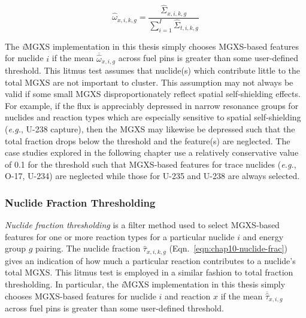 \begin{equation}
\label{eqn:chap10-tot-frac}
\hat{\omega}_{x,i,k,g} = \frac{\hat{\Sigma}_{x,i,k,g}}{\displaystyle\sum\limits_{i=1}^{I}\hat{\Sigma}_{t,i,k,g}}
\end{equation}

The \textit{i}\ac{MGXS} implementation in this thesis simply chooses \ac{MGXS}-based features for nuclide $i$ if the mean $\overline{\hat{\omega}}_{x,i,g}$ across fuel pins is greater than some user-defined threshold. This litmus test assumes that nuclide(s) which contribute little to the total \ac{MGXS} are not important to cluster. This assumption may not always be valid if some small \ac{MGXS} disproportionately reflect spatial self-shielding effects. For example, if the flux is appreciably depressed in narrow resonance groups for nuclides and reaction types which are especially sensitive to spatial self-shielding (\textit{e.g.}, U-238 capture), then the \ac{MGXS} may likewise be depressed such that the total fraction drops below the threshold and the feature(s) are neglected. The case studies explored in the following chapter use a relatively conservative value of 0.1 for the threshold such that \ac{MGXS}-based features for trace nuclides (\textit{e.g.}, O-17, U-234) are neglected while those for U-235 and U-238 are always selected.


\subsubsection{Nuclide Fraction Thresholding}
\label{subsubsec:chap10-litmus-nuc-frac}

\textit{Nuclide fraction thresholding} is a filter method used to select \ac{MGXS}-based features for one or more reaction types for a particular nuclide $i$ and energy group  $g$ pairing. The nuclide fraction $\hat{\tau}_{x,i,k,g}$ (Eqn.~\ref{eqn:chap10-nuclide-frac}) gives an indication of how much a particular reaction contributes to a nuclide's total \ac{MGXS}. This litmus test is employed in a similar fashion to total fraction thresholding. In particular, the \textit{i}\ac{MGXS} implementation in this thesis simply chooses \ac{MGXS}-based features for nuclide $i$ and reaction $x$ if the mean $\overline{\hat{\tau}}_{x,i,g}$ across fuel pins is greater than some user-defined threshold.

